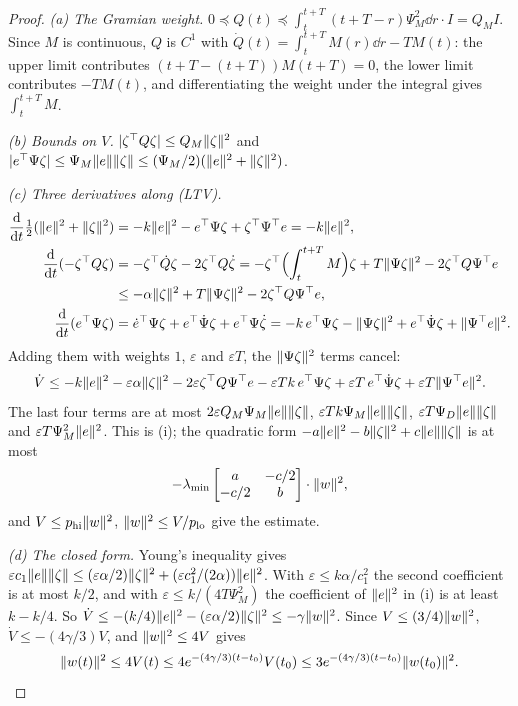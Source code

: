 \begin{proof}
\emph{(a) The Gramian weight.} $0\preceq Q(t)\preceq\int_t^{t+T}(t+T-r)\Psi_M^2\dd r\cdot I=Q_MI$. Since $M$ is
continuous, $Q$ is $C^1$ with $\dot Q(t)=\int_t^{t+T}M(r)\dd r-TM(t)$: the upper limit contributes
$(t+T-(t+T))M(t+T)=0$, the lower limit contributes $-TM(t)$, and differentiating the weight under the integral gives
$\int_t^{t+T}M$.

\noindent\emph{(b) Bounds on $V$.} $\lvert \zeta^\top Q\zeta\rvert\le Q_M\lVert \zeta\rVert^2$ and
$\lvert e^\top\Psi\zeta\rvert\le\Psi_M\lVert e\rVert\lVert \zeta\rVert\le(\Psi_M/2)(\lVert e\rVert^2+\lVert \zeta\rVert^2)$.

\noindent\emph{(c) Three derivatives along \textup{(LTV)}.}
\begin{align*}
  \frac{\mathrm{d}}{\mathrm{d}t}\tfrac12(\lVert e\rVert^2+\lVert \zeta\rVert^2)
    &=-k\lVert e\rVert^2-e^\top\Psi\zeta+\zeta^\top\Psi^\top e=-k\lVert e\rVert^2,\\
  \frac{\mathrm{d}}{\mathrm{d}t}(-\zeta^\top Q\zeta)&=-\zeta^\top\dot Q\zeta-2\zeta^\top Q\dot\zeta
    =-\zeta^\top\Bigl(\int_t^{t+T}M\Bigr)\zeta+T\lVert \Psi\zeta\rVert^2-2\zeta^\top Q\Psi^\top e\\
    &\le-\alpha\lVert \zeta\rVert^2+T\lVert \Psi\zeta\rVert^2-2\zeta^\top Q\Psi^\top e,\\
  \frac{\mathrm{d}}{\mathrm{d}t}(e^\top\Psi\zeta)&=\dot e^\top\Psi\zeta+e^\top\dot\Psi\zeta+e^\top\Psi\dot\zeta
    =-k\,e^\top\Psi\zeta-\lVert \Psi\zeta\rVert^2+e^\top\dot\Psi\zeta+\lVert \Psi^\top e\rVert^2.
\end{align*}
Adding them with weights $1$, $\varepsilon$ and $\varepsilon T$, the $\lVert \Psi\zeta\rVert^2$ terms cancel:
\[
  \dot V\le-k\lVert e\rVert^2-\varepsilon\alpha\lVert \zeta\rVert^2-2\varepsilon\zeta^\top Q\Psi^\top e
  -\varepsilon Tk\,e^\top\Psi\zeta+\varepsilon T\,e^\top\dot\Psi\zeta+\varepsilon T\lVert \Psi^\top e\rVert^2.
\]
The last four terms are at most $2\varepsilon Q_M\Psi_M\lVert e\rVert\lVert \zeta\rVert$,
$\varepsilon Tk\Psi_M\lVert e\rVert\lVert \zeta\rVert$, $\varepsilon T\Psi_D\lVert e\rVert\lVert \zeta\rVert$ and
$\varepsilon T\Psi_M^2\lVert e\rVert^2$. This is (i); the quadratic form
$-a\lVert e\rVert^2-b\lVert \zeta\rVert^2+c\lVert e\rVert\lVert \zeta\rVert$ is at most
\[
  -\lambda_{\min}\begin{bmatrix}a&-c/2\\-c/2&b\end{bmatrix}\cdot\lVert w\rVert^2,
\]
and $V\le p_{\mathrm{hi}}\lVert w\rVert^2$, $\lVert w\rVert^2\le V/p_{\mathrm{lo}}$ give the estimate.

\noindent\emph{(d) The closed form.} Young's inequality gives
$\varepsilon c_1\lVert e\rVert\lVert \zeta\rVert\le(\varepsilon\alpha/2)\lVert \zeta\rVert^2+(\varepsilon c_1^2/(2\alpha))\lVert e\rVert^2$.
With $\varepsilon\le k\alpha/c_1^2$ the second coefficient is at most $k/2$, and with
$\varepsilon\le k/(4T\Psi_M^2)$ the coefficient of $\lVert e\rVert^2$ in (i) is at least $k-k/4$. So
$\dot V\le-(k/4)\lVert e\rVert^2-(\varepsilon\alpha/2)\lVert \zeta\rVert^2\le-\gamma\lVert w\rVert^2$. Since
$V\le(3/4)\lVert w\rVert^2$, $\dot V\le-(4\gamma/3)V$, and $\lVert w\rVert^2\le4V$ gives
\[
  \lVert w(t)\rVert^2\le4V(t)\le4e^{-(4\gamma/3)(t-t_0)}V(t_0)\le3e^{-(4\gamma/3)(t-t_0)}\lVert w(t_0)\rVert^2.
\]


\end{proof}
